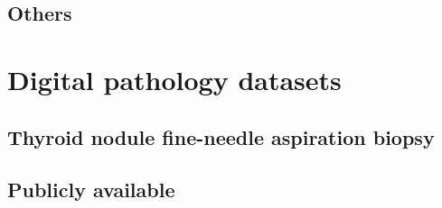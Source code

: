 \subsection{Others}

\section{Digital pathology datasets}
\label{sec:backdp:dataset}




\subsection{Thyroid nodule fine-needle aspiration biopsy}



\subsection{Publicly available}